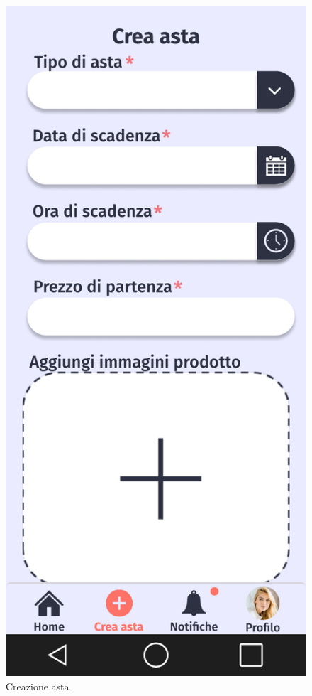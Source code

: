 \begin{figure}[!htb]
\begin{minipage}{0.32\textwidth}
            \includegraphics[width=.7\linewidth]{Immagini/Frames/Compratore/C4.pdf}
            \caption{Creazione asta}
        \end{minipage}\hfill
    \end{figure}

    \clearpage

